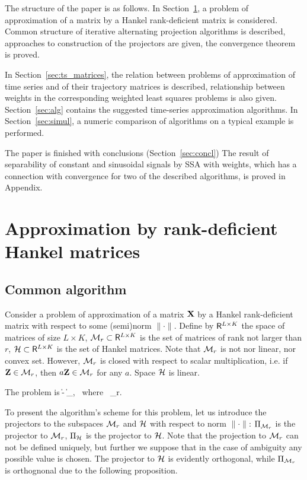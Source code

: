 \documentclass[sii]{ipart}
\begin{document}
The structure of the paper is as follows.  In Section~\ref{sec:lowrank_appr}, a problem of approximation of a matrix by a Hankel rank-deficient matrix is considered. Common structure of iterative alternating projection algorithms is described, approaches to construction of the projectors are given, the convergence theorem is proved.

In Section~\ref{sec:ts_matrices}, the relation between problems of approximation of time series and of their trajectory matrices is described, relationship between weights in the corresponding weighted least squares problems is also given. Section~\ref{sec:alg} contains the suggested time-series approximation algorithms. In Section~\ref{sec:simul}, a numeric comparison of algorithms on a typical example is performed.

The paper is finished with conclusions (Section~\ref{sec:concl}) The result of separability of constant and sinusoidal signals by SSA with weights, which has a connection with convergence for two of the described algorithms, is proved in Appendix.

\section{Approximation by rank-deficient Hankel matrices}
\label{sec:lowrank_appr}
\subsection{Common algorithm}
Consider a problem of approximation of a matrix $\mathbf{X}$ by a Hankel rank-deficient matrix with respect to some (semi)norm $\|\cdot\|$. Define by $\mathsf{R}^{L\times K}$ the space of matrices of size $L \times K$, $\mathcal{M}_r\subset \mathsf{R}^{L\times K}$ is the set of matrices of rank not larger than $r$,
$\mathcal{H} \subset \mathsf{R}^{L\times K}$ is the set of Hankel matrices.
Note that  $\mathcal{M}_r$ is not nor linear, nor convex set. However, $\mathcal{M}_r$ is closed with respect to scalar multiplication, i.e.
if $\mathbf{Z}\in \mathcal{M}_r$, then $a\mathbf{Z}\in \mathcal{M}_r$ for any $a$.
Space $\mathcal{H}$ is linear.

The problem is
\be
\label{eq:gen_task}
\|\bfX - \bfY\| \to \min_\bfY, \mbox{\ where\ } \bfY \in \calH \cap \calM_r.
\ee

To present the algorithm's scheme for this problem, let us introduce the projectors to the subspaces $\mathcal{M}_r$ and $\mathcal{H}$ with respect to norm $\|\cdot\|$: $\Pi_{\mathcal{M}_r}$ is the projector to $\mathcal{M}_r$,
$\Pi_{\mathcal{H}}$ is the projector to $\mathcal{H}$.
Note that the projection to $\mathcal{M}_r$ can not be defined uniquely, but further we suppose that in the case of ambiguity any possible value is chosen. The projector to $\mathcal{H}$ is evidently orthogonal, while $\Pi_{\mathcal{M}_r}$ is orthognonal due to the following proposition.
\end{document}
